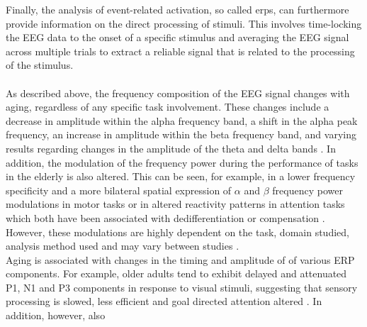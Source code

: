 Finally, the analysis of event-related activation, so called \glspl{erp}, can furthermore provide information on the direct processing of stimuli. This involves time-locking the EEG data to the onset of a specific stimulus and averaging the EEG signal across multiple trials to extract a reliable signal that is related to the processing of the stimulus.\\
\\
As described above, the frequency composition of the EEG signal changes with aging, regardless of any specific task involvement. These changes include a decrease in amplitude within the alpha frequency band, a shift in the alpha peak frequency, an increase in amplitude within the beta frequency band, and varying results regarding changes in the amplitude of the theta and delta bands \cite{ROSSINI2007375, Ishii2017, Courtney2021}. In addition, the modulation of the frequency power during the performance of tasks in the elderly is also altered. This can be seen, for example, in a lower frequency specificity and a more bilateral spatial expression of $\alpha$ and $\beta$ frequency power modulations in motor tasks or in altered reactivity patterns in attention tasks which both have been associated with dedifferentiation or compensation \cite{Deiber2013, Quandt2016}. However, these modulations are highly dependent on the task, domain studied, analysis method used and may vary between studies \cite{HUBNER2018104}.\\
Aging is associated with changes in the timing and amplitude of of various ERP components. For example, older adults tend to exhibit delayed and attenuated P1, N1 and P3 components in response to visual stimuli, suggesting that sensory processing is slowed, less efficient and goal directed attention altered \cite{Deiber2013}. In addition, however, also \\





